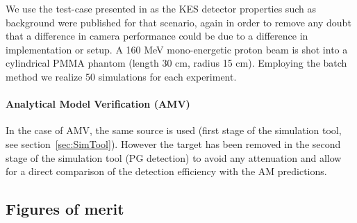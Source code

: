 \documentclass[a4paper,english,12pt]{article}
\begin{document}
We use the test-case presented in \cite{Perali2014} as the KES detector properties such as background were published for that scenario, again in order to remove any doubt that a difference in camera performance could be due to a difference in implementation or setup. A 160 MeV mono-energetic proton beam is shot into a cylindrical PMMA phantom (length 30 cm, radius 15 cm). Employing the batch method we realize 50 simulations for each experiment.

\paragraph{Analytical Model Verification (AMV)}

In the case of AMV, the same source is used (first stage of the simulation tool, see section~\ref{sec:SimTool}). However the target has been removed in the second stage of the simulation tool (PG detection) to avoid any attenuation and allow for a direct comparison of the detection efficiency with the AM predictions.


\subsection{Figures of merit}\label{figmerit}



\end{document}
